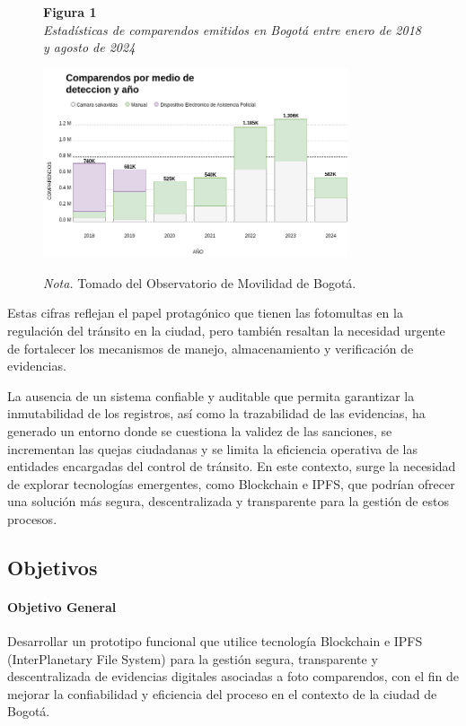 \begin{figure}[htbp]
    \begin{flushleft}
        \textbf{Figura 1}\\
        \textit{Estadísticas de comparendos emitidos en Bogotá entre enero de 2018 y agosto de 2024}
    \end{flushleft}
    \centering
    \includegraphics[width=0.8\textwidth]{Images/numComparendos.png}
    \vspace{0.5em}
    \begin{flushleft}
        \textit{Nota.} Tomado del Observatorio de Movilidad de Bogotá.
    \end{flushleft}
    \label{fig:estadisticas_comparendos}
\end{figure}

Estas cifras reflejan el papel protagónico que tienen las fotomultas en la regulación del tránsito en la ciudad, pero también resaltan la necesidad urgente de fortalecer los mecanismos de manejo, almacenamiento y verificación de evidencias.  

La ausencia de un sistema confiable y auditable que permita garantizar la inmutabilidad de los registros, así como la trazabilidad de las evidencias, ha generado un entorno donde se cuestiona la validez de las sanciones, se incrementan las quejas ciudadanas y se limita la eficiencia operativa de las entidades encargadas del control de tránsito. En este contexto, surge la necesidad de explorar tecnologías emergentes, como Blockchain e IPFS, que podrían ofrecer una solución más segura, descentralizada y transparente para la gestión de estos procesos. 

\subsection{Objetivos}
\paragraph{Objetivo General}
Desarrollar un prototipo funcional que utilice tecnología Blockchain e IPFS (InterPlanetary File System)  para la gestión segura, transparente y descentralizada de evidencias digitales asociadas a foto comparendos, con el fin de mejorar la confiabilidad y eficiencia del proceso en el contexto de la ciudad de Bogotá. 

